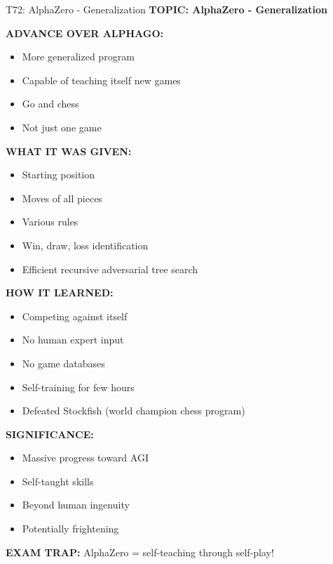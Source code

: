 \documentclass[8pt]{beamer}
\begin{document}
	\begin{frame}{T72: AlphaZero - Generalization}
		\fontsize{6.5}{7.5}\selectfont
		\textbf{TOPIC: AlphaZero - Generalization}
		
		\vspace{0.1cm}
		\textbf{ADVANCE OVER ALPHAGO:}
		\begin{itemize}
			\item More generalized program
			\item Capable of teaching itself new games
			\item Go and chess
			\item Not just one game
		\end{itemize}
		
		\vspace{0.1cm}
		\textbf{WHAT IT WAS GIVEN:}
		\begin{itemize}
			\item Starting position
			\item Moves of all pieces
			\item Various rules
			\item Win, draw, loss identification
			\item Efficient recursive adversarial tree search
		\end{itemize}
		
		\vspace{0.1cm}
		\textbf{HOW IT LEARNED:}
		\begin{itemize}
			\item Competing against itself
			\item No human expert input
			\item No game databases
			\item Self-training for few hours
			\item Defeated Stockfish (world champion chess program)
		\end{itemize}
		
		\vspace{0.1cm}
		\textbf{SIGNIFICANCE:}
		\begin{itemize}
			\item Massive progress toward AGI
			\item Self-taught skills
			\item Beyond human ingenuity
			\item Potentially frightening
		\end{itemize}
		
		\textcolor{myred}{\textbf{EXAM TRAP:}} AlphaZero = \textcolor{myblue}{self-teaching through self-play}!
	\end{frame}
	
\end{document}
